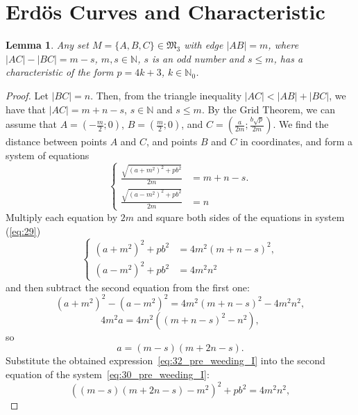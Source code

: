 \documentclass[a4paper,14pt]{article} %
\theoremstyle{plain}
\newtheorem{lemma}[theorem]{Lemma}
\theoremstyle{definition}
\begin{document}
\section{Erdös Curves and Characteristic}

\begin{lemma}
	\label{lem:pre_weeding_I}
	Any set $M = \{A, B, C\} \in \mathfrak{M}_3$ with edge $|AB| = m$, where $|AC| - |BC| = m - s$, $m, s \in \mathbb{N}$, $s$ is an odd number and $s \leq m$, has a characteristic of the form $p = 4k + 3$, $k \in \mathbb{N}_0$.
\end{lemma}

\begin{proof}
	Let $|BC| = n$. Then, from the triangle inequality $|AC| < |AB| + |BC|$, we have that $|AC| = m + n - s$, $s \in \mathbb{N}$ and $s \leq m$.
	By the Grid Theorem, we can assume that $A = (-\frac{m}{2}; 0)$, $B = (\frac{m}{2}; 0)$, and $C = (\frac{a}{2m}; \frac{b\sqrt{p}}{2m})$. We find the distance between points $A$ and $C$, and points $B$ and $C$ in coordinates, and form a system of equations
	\begin{equation}
		\label{eq:29}
		\begin{cases}
		\frac{\sqrt{(a+m^2)^2+pb^2}}{2m}&=m+n-s.\\
		\frac{\sqrt{(a-m^2)^2+pb^2}}{2m}&=n
		\end{cases}
	\end{equation}
	Multiply each equation by $2m$ and square both sides of the equations in system (\ref{eq:29})
	\begin{equation}
		\label{eq:30_pre_weeding_I}
		\begin{cases}
		(a+m^2)^2+pb^2&=4m^2(m+n-s)^2,\\
		(a-m^2)^2+pb^2&=4m^2n^2
		\end{cases}
	\end{equation}
	and then subtract the second equation from the first one:
	\begin{equation}
	(a+m^2)^2-(a-m^2)^2=4m^2(m+n-s)^2-4m^2n^2,
	\label{eq: 31}
	\end{equation}
	$$
	4m^2a=4m^2((m+n-s)^2-n^2),
	$$
	so
	\begin{equation}
		\label{eq:32_pre_weeding_I}
		a=(m-s)(m+2n-s).
	\end{equation}
	Substitute the obtained expression~\eqref{eq:32_pre_weeding_I}
	into the second equation of the system~\eqref{eq:30_pre_weeding_I}:
	\begin{equation}
		((m-s)(m+2n-s)-m^2)^2+pb^2=4m^2n^2,
	\end{equation}

\end{proof}
\end{document}
